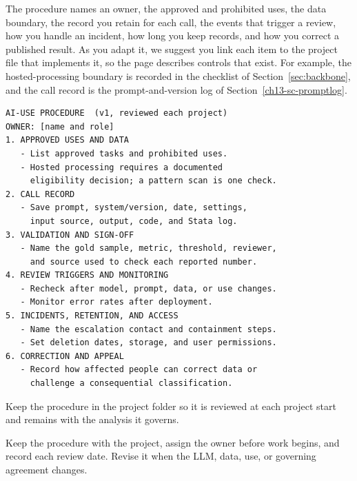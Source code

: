 The procedure names an owner, the approved and prohibited uses, the data boundary, the record you retain for each call, the events that trigger a review, how you handle an incident, how long you keep records, and how you correct a published result. As you adapt it, we suggest you link each item to the project file that implements it, so the page describes controls that exist. For example, the hosted-processing boundary is recorded in the checklist of Section~\ref{sec:backbone}, and the call record is the prompt-and-version log of Section~\ref{ch13-sc-promptlog}.

\begin{kaobox}[frametitle={A one-page AI-use procedure for a two-person shop}]
\par
{\footnotesize
\begin{verbatim}
AI-USE PROCEDURE  (v1, reviewed each project)
OWNER: [name and role]
1. APPROVED USES AND DATA
   - List approved tasks and prohibited uses.
   - Hosted processing requires a documented
     eligibility decision; a pattern scan is one check.
2. CALL RECORD
   - Save prompt, system/version, date, settings,
     input source, output, code, and Stata log.
3. VALIDATION AND SIGN-OFF
   - Name the gold sample, metric, threshold, reviewer,
     and source used to check each reported number.
4. REVIEW TRIGGERS AND MONITORING
   - Recheck after model, prompt, data, or use changes.
   - Monitor error rates after deployment.
5. INCIDENTS, RETENTION, AND ACCESS
   - Name the escalation contact and containment steps.
   - Set deletion dates, storage, and user permissions.
6. CORRECTION AND APPEAL
   - Record how affected people can correct data or
     challenge a consequential classification.
\end{verbatim}
}
Keep the procedure in the project folder so it is reviewed at each project start and remains with the analysis it governs.
\end{kaobox}

Keep the procedure with the project, assign the owner before work begins, and record each review date. Revise it when the LLM, data, use, or governing agreement changes.

